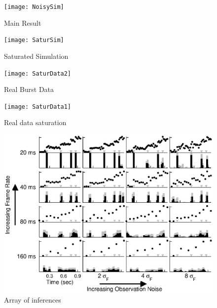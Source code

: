 \documentclass[12pt]{article}
\begin{document}
\begin{figure}[h]
\texttt{[image: NoisySim]}
\caption{Main Result}  \label{fig:noisy}
\end{figure}

\clearpage \newpage
\begin{figure}
\texttt{[image: SaturSim]}
\caption{Saturated Simulation} \label{fig:SaturSim}
\end{figure}

\clearpage \newpage
\begin{figure}
\texttt{[image: SaturData2]}
\caption{Real Burst Data} \label{fig:SaturData1}
\end{figure}

\clearpage \newpage
\begin{figure}
\texttt{[image: SaturData1]}
\caption{Real data saturation} \label{fig:SaturData2}
\end{figure}

\clearpage \newpage
\begin{figure}
\includegraphics[width=1.0\linewidth]{ArraySim}
\caption{Array of inferences} \label{fig:array}
\end{figure}
\end{document}

